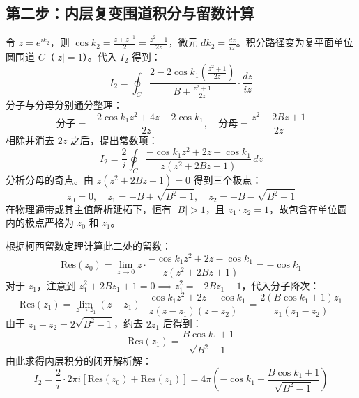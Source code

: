 \documentclass[12pt,a4paper]{ctexart}
\begin{document}
\subsection{第二步：内层复变围道积分与留数计算}
令 $z = e^{i k_2}$，则 $\cos k_2 = \frac{z + z^{-1}}{2} = \frac{z^2 + 1}{2z}$，微元 $dk_2 = \frac{dz}{iz}$。积分路径变为复平面单位圆围道 $C$（$|z|=1$）。代入 $I_2$ 得到：
\begin{equation}
I_2 = \oint_{C} \frac{2 - 2\cos k_1 \left(\frac{z^2+1}{2z}\right)}{B + \frac{z^2+1}{2z}} \cdot \frac{dz}{iz}
\end{equation}
分子与分母分别通分整理：
\begin{equation}
\text{分子} = \frac{-2\cos k_1 z^2 + 4z - 2\cos k_1}{2z}, \quad \text{分母} = \frac{z^2 + 2Bz + 1}{2z}
\end{equation}
相除并消去 $2z$ 之后，提出常数项：
\begin{equation}
I_2 = \frac{2}{i} \oint_{C} \frac{-\cos k_1 z^2 + 2z - \cos k_1}{z(z^2 + 2Bz + 1)} \, dz
\end{equation}
分析分母的奇点。由 $z(z^2 + 2Bz + 1) = 0$ 得到三个极点：
\begin{equation}
z_0 = 0, \quad z_1 = -B + \sqrt{B^2 - 1}, \quad z_2 = -B - \sqrt{B^2 - 1}
\end{equation}
在物理通带或其主值解析延拓下，恒有 $|B| > 1$，且 $z_1 \cdot z_2 = 1$，故包含在单位圆内的极点严格为 $z_0$ 和 $z_1$。

根据柯西留数定理计算此二处的留数：
\begin{equation}
\text{Res}(z_0) = \lim_{z \to 0} z \cdot \frac{-\cos k_1 z^2 + 2z - \cos k_1}{z(z^2 + 2Bz + 1)} = -\cos k_1
\end{equation}
对于 $z_1$，注意到 $z_1^2 + 2Bz_1 + 1 = 0 \implies z_1^2 = -2Bz_1 - 1$，代入分子降次：
\begin{equation}
\text{Res}(z_1) = \lim_{z \to z_1} (z - z_1) \frac{-\cos k_1 z^2 + 2z - \cos k_1}{z(z-z_1)(z-z_2)} = \frac{2(B\cos k_1 + 1)z_1}{z_1(z_1 - z_2)}
\end{equation}
由于 $z_1 - z_2 = 2\sqrt{B^2 - 1}$，约去 $2z_1$ 后得到：
\begin{equation}
\text{Res}(z_1) = \frac{B\cos k_1 + 1}{\sqrt{B^2 - 1}}
\end{equation}
由此求得内层积分的闭开解析解：
\begin{equation}
I_2 = \frac{2}{i} \cdot 2\pi i \left[ \text{Res}(z_0) + \text{Res}(z_1) \right] = 4\pi \left( -\cos k_1 + \frac{B\cos k_1 + 1}{\sqrt{B^2 - 1}} \right)
\end{equation}
\end{document}
